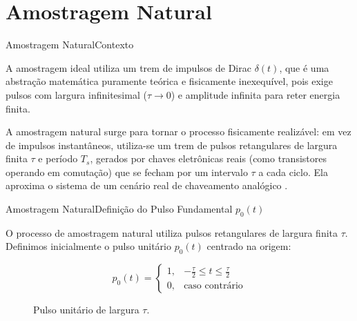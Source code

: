\section{Amostragem Natural}

\begin{frame}{Amostragem Natural}{Contexto}
	
	A amostragem ideal utiliza um trem de impulsos de Dirac $\delta(t)$, que é uma abstração matemática puramente teórica e fisicamente inexequível, pois exige pulsos com largura infinitesimal ($\tau \to 0$) e amplitude infinita para reter energia finita. 
	
	A amostragem natural surge para tornar o processo fisicamente realizável: em vez de impulsos instantâneos, utiliza-se um trem de pulsos retangulares de largura finita $\tau$ e período $T_s$, gerados por chaves eletrônicas reais (como transistores operando em comutação) que se fecham por um intervalo $\tau$ a cada ciclo. Ela aproxima o sistema de um cenário real de chaveamento analógico \cite{lathi2012sistemas}.
	
\end{frame}

\begin{frame}{Amostragem Natural}{Definição do Pulso Fundamental $p_0(t)$}
	
	O processo de amostragem natural utiliza pulsos retangulares de largura finita $\tau$. Definimos inicialmente o pulso unitário $p_0(t)$ centrado na origem:
	
	\begin{equation}
		p_0(t) = 
		\begin{cases}
			1, & -\frac{\tau}{2} \le t \le \frac{\tau}{2} \\[6pt]
			0, & \text{caso contrário}
		\end{cases}
		\label{eq: definicao_pulso_unitario_natural}
	\end{equation}
	
	\begin{figure}
		\vfill
		\centering
		\vspace{-1em}
		\caption{Pulso unitário de largura $\tau$.}
		\label{fig: pulso_unitario_natural}
	\end{figure}
	
\end{frame}

